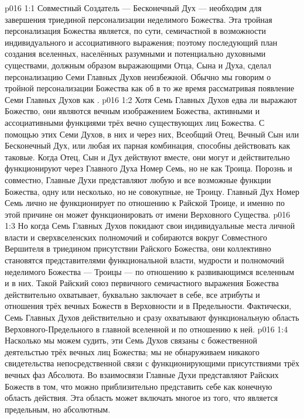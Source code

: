 \vs p016 1:1 Совместный Создатель --- Бесконечный Дух --- необходим для завершения триединой персонализации неделимого Божества. Эта тройная персонализация Божества является, по сути, семичастной в возможности индивидуального и ассоциативного выражения; поэтому последующий план создания вселенных, населённых разумными и потенциально духовными существами, должным образом выражающими Отца, Сына и Духа, сделал персонализацию Семи Главных Духов неизбежной. Обычно мы говорим о тройной персонализации Божества как об  в то же время рассматривая появление Семи Главных Духов как .
\vs p016 1:2 Хотя Семь Главных Духов едва ли выражают  Божество, они являются вечным изображением  Божества, активными и ассоциативными функциями трёх вечно существующих лиц Божества. С помощью этих Семи Духов, в них и через них, Всеобщий Отец, Вечный Сын или Бесконечный Дух, или любая их парная комбинация, способны действовать как таковые. Когда Отец, Сын и Дух действуют вместе, они могут и действительно функционируют через Главного Духа Номер Семь, но не как Троица. Порознь и совместно, Главные Духи представляют любую и все возможные функции Божества, одну или несколько, но не совокупные, не Троицу. Главный Дух Номер Семь лично не функционирует по отношению к Райской Троице, и именно по этой причине он может функционировать  от имени Верховного Существа.
\vs p016 1:3 Но когда Семь Главных Духов покидают свои индивидуальные места личной власти и сверхвселенских полномочий и собираются вокруг Совместного Вершителя в триедином присутствии Райского Божества, они коллективно становятся представителями функциональной власти, мудрости и полномочий неделимого Божества --- Троицы --- по отношению к развивающимся вселенным и в них. Такой Райский союз первичного семичастного выражения Божества действительно охватывает, буквально заключает в себе, все атрибуты и отношения трёх вечных Божеств в Верховности и в Предельности. Фактически, Семь Главных Духов действительно и сразу охватывают функциональную область Верховного\hyp{}Предельного в главной вселенной и по отношению к ней.
\vs p016 1:4 Насколько мы можем судить, эти Семь Духов связаны с божественной деятельстью трёх вечных лиц Божества; мы не обнаруживаем никакого свидетельства непосредственной связи с функционирующими присутствиями трёх вечных фаз Абсолюта. Во взаимосвязи Главные Духи представляют Райских Божеств в том, что можно приблизительно представить себе как конечную область действия. Эта область может включать многое из того, что является предельным, но  абсолютным.
